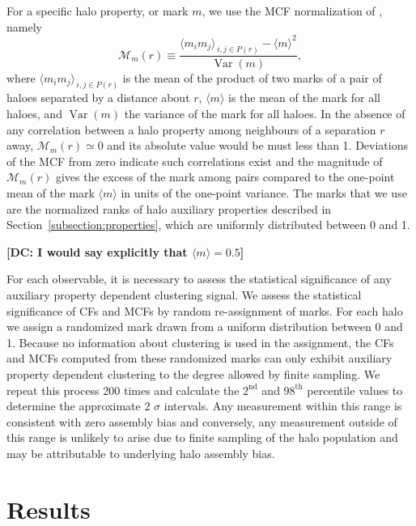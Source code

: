 \documentclass[usenatbib,fleqn]{mnras}
\begin{document}
For a specific halo property, or mark $m$, we use the MCF normalization of \citet{wechsler_etal06}, namely 
%
\begin{equation}
\label{eq:mcf}
\mathcal{M}_m(r) \equiv \frac{\langle m_i m_j \rangle_{\,i,j \in P(r)} - 
\langle m \rangle^2}{\operatorname{Var}(m)},
\end{equation}
%
where $\langle m_i m_j \rangle_{\,i,j \in P(r)}$ is the mean of the product of two marks of a pair of haloes separated by a distance about $r$, $\langle m \rangle$ is the mean of the mark for all haloes, and $\operatorname{Var}(m)$ the variance of the mark for all haloes.
In the absence of any correlation between a halo property among neighbours of a separation $r$ away, $\mathcal{M}_m(r) \simeq 0$ and its absolute value would be must less than 1. Deviations of the MCF from zero indicate such correlations exist and the magnitude of $\mathcal{M}_m(r)$ gives the excess of the mark among pairs compared to the one-point mean of the mark $\langle m\rangle$ in units of the one-point variance. The marks that we use are the normalized ranks of halo auxiliary properties described in Section~\ref{subsection:properties}, which are uniformly distributed between 0 and 1.

{\bf [DC: I would say explicitly that $\langle m \rangle=0.5$]}

For each observable, it is necessary to assess the statistical significance of any auxiliary property dependent clustering signal. We assess the statistical significance of CFs and MCFs by random re-assignment of marks. For each halo we assign a randomized mark drawn from a uniform distribution between 0 and 1. Because no information about clustering is used in the assignment, the CFs and MCFs computed from these randomized marks can only exhibit auxiliary property dependent clustering to the degree allowed by finite sampling. We repeat this process 200 times and calculate the $2^{\mathrm{nd}}$ and $98^{\mathrm{th}}$ percentile values to determine the approximate 2 $\sigma$ intervals. Any measurement within this range is consistent with zero assembly bias and conversely, any measurement outside of this range is unlikely to arise due to finite sampling of the halo population and may be attributable to underlying halo assembly bias.


\section[]{Results}
\label{section:results}
\end{document}
